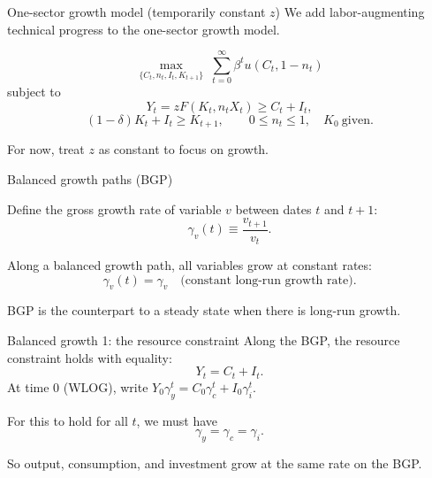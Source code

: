 \documentclass[aspectratio=169,xcolor=dvipsnames]{beamer}
\let\tempone\itemize
\let\temptwo\enditemize
\renewenvironment{itemize}{\tempone\addtolength{\itemsep}{\fill}}{\temptwo}
\begin{document}
\begin{frame}{One-sector growth model (temporarily constant \(z\))}
\label{slide:BC_GrowthModel}
\small
We add labor-augmenting technical progress to the one-sector growth model.

\vspace{0.4em}
\[
\max_{\{C_t,n_t,I_t,K_{t+1}\}}\; \sum_{t=0}^{\infty}\beta^t u(C_t,1-n_t)
\]
subject to
\[
Y_t = z F(K_t,n_t X_t) \ge C_t + I_t,
\]
\[
(1-\delta)K_t + I_t \ge K_{t+1},
\qquad
0\le n_t\le 1,\quad K_0\ \text{given.}
\]
\begin{itemize}
    \item For now, treat \(z\) as constant to focus on growth.
\end{itemize}
\end{frame}

\begin{frame}{Balanced growth paths (BGP)}
\label{slide:BC_BGP_Def}
\small
\begin{itemize}
    \item Define the gross growth rate of variable \(v\) between dates \(t\) and \(t+1\):
    \[
        \gamma_v(t) \equiv \frac{v_{t+1}}{v_t}.
    \]
    \item Along a balanced growth path, all variables grow at constant rates:
    \[
        \gamma_v(t)=\gamma_v \quad\text{(constant long-run growth rate).}
    \]
    \item BGP is the counterpart to a steady state when there is long-run growth.
\end{itemize}
\end{frame}

\begin{frame}{Balanced growth 1: the resource constraint}
\label{slide:BC_BGP_Resource}
\small
Along the BGP, the resource constraint holds with equality:
\[
Y_t = C_t + I_t.
\]
At time 0 (WLOG), write \(Y_0\gamma_y^t = C_0\gamma_c^t + I_0\gamma_i^t\).

\vspace{0.4em}
\begin{itemize}
    \item For this to hold for all \(t\), we must have
    \[
        \gamma_y = \gamma_c = \gamma_i.
    \]
    \item So output, consumption, and investment grow at the same rate on the BGP.
\end{itemize}
\end{frame}
\end{document}

